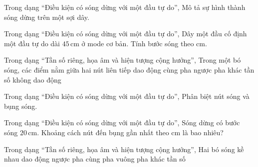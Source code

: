 \begin{ex}
Trong dạng “Điều kiện có sóng dừng với một đầu tự do”, Mô tả sự hình thành sóng dừng trên một sợi dây.
\choiceTF

\end{ex}

\begin{ex}
Trong dạng “Điều kiện có sóng dừng với một đầu tự do”, Dây một đầu cố định một đầu tự do dài $45\,\text{cm}$ ở mode cơ bản. Tính bước sóng theo cm.
\end{ex}

\begin{ex}
Trong dạng “Tần số riêng, họa âm và hiện tượng cộng hưởng”, Trong một bó sóng, các điểm nằm giữa hai nút liên tiếp dao động
\choice
{\True cùng pha}
{ngược pha}
{khác tần số}
{không dao động}
\end{ex}

\begin{ex}
Trong dạng “Điều kiện có sóng dừng với một đầu tự do”, Phân biệt nút sóng và bụng sóng.
\choiceTF

\end{ex}

\begin{ex}
Trong dạng “Điều kiện có sóng dừng với một đầu tự do”, Sóng dừng có bước sóng $20\,\text{cm}$. Khoảng cách nút đến bụng gần nhất theo cm là bao nhiêu?
\end{ex}

\begin{ex}
Trong dạng “Tần số riêng, họa âm và hiện tượng cộng hưởng”, Hai bó sóng kề nhau dao động
\choice
{\True ngược pha}
{cùng pha}
{vuông pha}
{khác tần số}
\end{ex}

